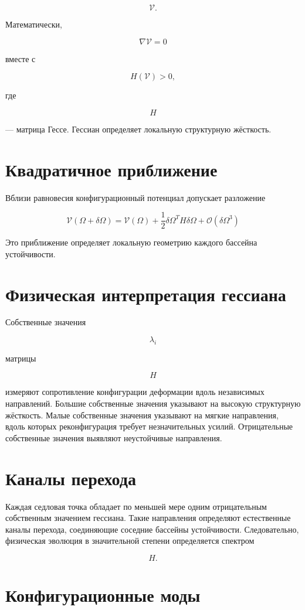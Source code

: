 \[ \mathcal V. \]

Математически,

\[ \nabla\mathcal V=0 \]

вместе с

\[ H(\mathcal V)>0, \]

где

\[ H \]

— матрица Гессе. Гессиан определяет локальную структурную жёсткость.

\section{Квадратичное приближение}

Вблизи равновесия конфигурационный потенциал допускает разложение

\[ \boxed{ \mathcal V(\Omega+\delta\Omega) = \mathcal V(\Omega) + \frac12 \delta\Omega^{T} H \delta\Omega + \mathcal O(\delta\Omega^3) } \]

Это приближение определяет локальную геометрию каждого бассейна устойчивости.

\section{Физическая интерпретация гессиана}

Собственные значения

\[ \lambda_i \]

матрицы

\[ H \]

измеряют сопротивление конфигурации деформации вдоль независимых направлений. Большие собственные значения указывают на высокую структурную жёсткость. Малые собственные значения указывают на мягкие направления, вдоль которых реконфигурация требует незначительных усилий. Отрицательные собственные значения выявляют неустойчивые направления.

\section{Каналы перехода}

Каждая седловая точка обладает по меньшей мере одним отрицательным собственным значением гессиана. Такие направления определяют естественные каналы перехода, соединяющие соседние бассейны устойчивости. Следовательно, физическая эволюция в значительной степени определяется спектром

\[ H. \]

\section{Конфигурационные моды}

